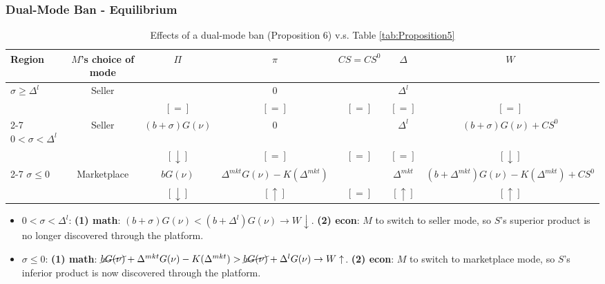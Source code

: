 \begin{frame}
  \frametitle{Dual-Mode Ban - Equilibrium}
  \small

  \begin{table}
    \centering
    \caption{Effects of a dual-mode ban (Proposition 6) v.s. Table \ref{tab:Proposition5}}
    \label{tab:dual-mode-ban-effects}
    \scriptsize
    \setlength{\tabcolsep}{1.5pt}
    \begin{tabular}{@{}lcccccc@{}}
      \toprule
      Region & $M$'s choice of mode & $\Pi$ & $\pi$ & $CS = CS^0$ & $\Delta$ & $W$ \\
      \midrule
      $\sigma\geq\Delta^l$
        & Seller & $ $ & 0 & & $\Delta^l$ & $ $ \\
        & & $[=]$ & $[=]$ & $[=]$ & $[=]$ & $[=]$ \\
        \cmidrule(lr){2-7}
      $0<\sigma<\Delta^l$
        & Seller & $(b+\sigma)G(\nu)$ & 0 & & $\Delta^l$ & $(b+\sigma)G(\nu)+CS^0$ \\
        & & $[\downarrow]$ & $[=]$ & $[=]$ & $[=]$ & $[\downarrow]$ \\
        \cmidrule(lr){2-7}
      $\sigma\leq0$
        & Marketplace & ${bG(\nu)}$ & $\Delta^{mkt}G(\nu)-K(\Delta^{mkt})$ & & $\Delta^{mkt}$ & $(b+\Delta^{mkt})G(\nu)-K(\Delta^{mkt})+CS^0$ \\
        & & $[\downarrow]$ & $[\uparrow]$ & $[=]$ & $[\uparrow]$ & $[\uparrow]$ \\
      \bottomrule
    \end{tabular}
  \end{table}

  \begin{itemize}
    \item $0<\sigma<\Delta^l$: \textbf{(1) math}: $(b+\sigma)G(\nu) < (b + \Delta^l)G(\nu) \to W \downarrow$. \textbf{(2) econ}: \(M\) to switch to seller mode, so \(S\)'s superior product is no longer discovered through the platform.
    \item $\sigma\leq0$: \textbf{(1) math}: $\cancel{bG(\nu)} + \Delta^{mkt}G(\nu)-K(\Delta^{mkt}) > \cancel{bG(\nu)} + \Delta^{l}G(\nu) \to W \uparrow$. \textbf{(2) econ}: \(M\) to switch to marketplace mode, so \(S\)'s inferior product is now discovered through the platform.
  \end{itemize}
\end{frame}


